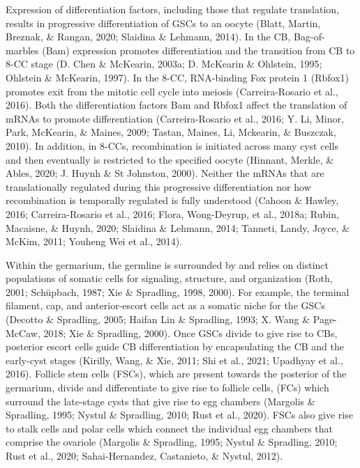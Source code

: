 \documentclass[12pt,oneside]{reedthesis}
\begin{document}
Expression of differentiation factors, including those that regulate
translation, results in progressive differentiation of GSCs to an oocyte
(Blatt, Martin, Breznak, \& Rangan, 2020; Slaidina \& Lehmann, 2014). In
the CB, Bag-of-marbles (Bam) expression promotes differentiation and the
transition from CB to 8-CC stage (D. Chen \& McKearin, 2003a; D. McKearin \& Ohlstein, 1995; Ohlstein \& McKearin, 1997). In the 8-CC, RNA-binding
Fox protein 1 (Rbfox1) promotes exit from the mitotic cell cycle into
meiosis (Carreira-Rosario et al., 2016). Both the differentiation factors
Bam and Rbfox1 affect the translation of mRNAs to promote
differentiation (Carreira-Rosario et al., 2016; Y. Li, Minor, Park, McKearin, \& Maines, 2009; Tastan, Maines, Li, Mckearin, \& Buszczak, 2010). In addition, in 8-CCs,
recombination is initiated across many cyst cells and then eventually is
restricted to the specified oocyte
(Hinnant, Merkle, \& Ables, 2020; J. Huynh \& St Johnston, 2000). Neither the mRNAs that are translationally
regulated during this progressive differentiation nor how recombination
is temporally regulated is fully understood
(Cahoon \& Hawley, 2016; Carreira-Rosario et al., 2016; Flora, Wong-Deyrup, et al., 2018a; Rubin, Macaisne, \& Huynh, 2020; Slaidina \& Lehmann, 2014; Tanneti, Landy, Joyce, \& McKim, 2011; Youheng Wei et al., 2014).

Within the germarium, the germline is surrounded by and relies on
distinct populations of somatic cells for signaling, structure, and
organization (Roth, 2001; Schüpbach, 1987; Xie \& Spradling, 1998, 2000). For example, the
terminal filament, cap, and anterior-escort cells act as a somatic niche
for the GSCs (Decotto \& Spradling, 2005; Haifan Lin \& Spradling, 1993; X. Wang \& Page-McCaw, 2018; Xie \& Spradling, 2000). Once GSCs divide to give rise to CBs, posterior escort
cells guide CB differentiation by encapsulating the CB and the
early-cyst stages (Kirilly, Wang, \& Xie, 2011; Shi et al., 2021; Upadhyay et al., 2016). Follicle stem cells
(FSCs), which are present towards the posterior of the germarium, divide
and differentiate to give rise to follicle cells, (FCs) which surround
the late-stage cysts that give rise to egg chambers (Margolis \& Spradling, 1995; Nystul \& Spradling, 2010; Rust et al., 2020). FSCs also give rise to stalk cells
and polar cells which connect the individual egg chambers that comprise
the ovariole (Margolis \& Spradling, 1995; Nystul \& Spradling, 2010; Rust et al., 2020; Sahai-Hernandez, Castanieto, \& Nystul, 2012).
\end{document}
